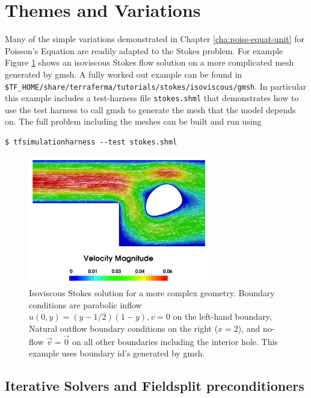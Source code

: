 \section{Themes and Variations}
\label{sec:themes-variations}

Many of the simple variations demonstrated in Chapter
\ref{cha:poiss-equat-unit} for Poisson's Equation are readily adapted
to the Stokes problem.  For example Figure \ref{fig:stokes_gmsh} shows
an isoviscous Stokes flow solution on a more complicated mesh
generated by gmsh.  A fully worked out example 
can be found in
\texttt{\$TF\_HOME/share/terraferma/tutorials/stokes/isoviscous/gmsh}.
In particular this example includes  a test-harness file
\texttt{stokes.shml} that demonstrates how to use the test harness to
call gmsh to generate the mesh that the model depends on.  The full
problem including the meshes can be built and run using
\begin{lstlisting}[style=Bash]
$ tfsimulationharness --test stokes.shml
\end{lstlisting} %



\begin{figure}[htbp!]
  \centering
  \includegraphics[width=0.7\textwidth]{figures/stokes_gmsh.png}
  \caption{\small Isoviscous Stokes solution for a more complex geometry.
    Boundary conditions are parabolic inflow $u(0,y)=(y-1/2)(1-y),
    v=0$ on the left-hand boundary, Natural outflow boundary
    conditions on the right ($x=2$), and no-flow $\vec{v}=\vec{0}$ on
    all other boundaries including the interior hole.  This example
    uses boundary id's generated by gmsh.}
  \label{fig:stokes_gmsh}
\end{figure}

\subsection{Iterative Solvers and Fieldsplit preconditioners}
\label{sec:iterative-solvers-1}

